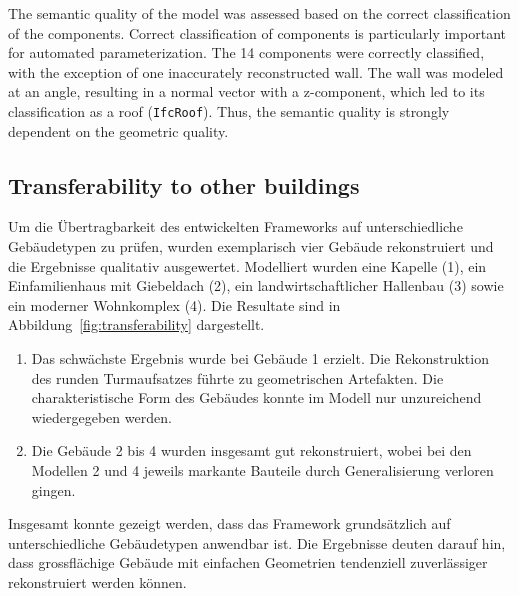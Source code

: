 \begin{English}
    The semantic quality of the model was assessed based on the correct classification of the components. Correct classification of components is particularly important for automated parameterization. The 14 components were correctly classified, with the exception of one inaccurately reconstructed wall. The wall was modeled at an angle, resulting in a normal vector with a z-component, which led to its classification as a roof (\texttt{IfcRoof}). Thus, the semantic quality is strongly dependent on the geometric quality.
\end{English}

\subsection{Transferability to other buildings}
\begin{German}
    Um die Übertragbarkeit des entwickelten Frameworks auf unterschiedliche Gebäudetypen zu prüfen, wurden exemplarisch vier Gebäude rekonstruiert und die Ergebnisse qualitativ ausgewertet. Modelliert wurden eine Kapelle (1), ein Einfamilienhaus mit Giebeldach (2), ein landwirtschaftlicher Hallenbau (3) sowie ein moderner Wohnkomplex (4). Die Resultate sind in Abbildung~\ref{fig:transferability} dargestellt.

\begin{enumerate}
    \item Das schwächste Ergebnis wurde bei Gebäude 1 erzielt. Die Rekonstruktion des runden Turmaufsatzes führte zu geometrischen Artefakten. Die charakteristische Form des Gebäudes konnte im Modell nur unzureichend wiedergegeben werden.
    \item Die Gebäude 2 bis 4 wurden insgesamt gut rekonstruiert, wobei bei den Modellen 2 und 4 jeweils markante Bauteile durch Generalisierung verloren gingen.
\end{enumerate}

    Insgesamt konnte gezeigt werden, dass das Framework grundsätzlich auf unterschiedliche Gebäudetypen anwendbar ist. Die Ergebnisse deuten darauf hin, dass grossflächige Gebäude mit einfachen Geometrien tendenziell zuverlässiger rekonstruiert werden können.
\end{German}

